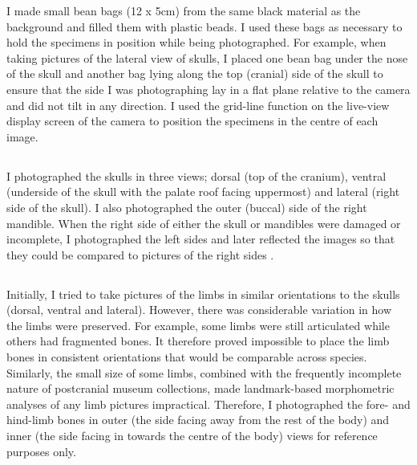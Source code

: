 I made small bean bags (12 x 5cm) from the same black material as the background and filled them with plastic beads. I used these bags as necessary to hold the specimens in position while being photographed. For example, when taking pictures of the lateral view of skulls, I placed one bean bag under the nose of the skull and another bag lying along the top (cranial) side of the skull to ensure that the side I was photographing lay in a flat plane relative to the camera and did not tilt in any direction. 
I used the grid-line function on the live-view display screen of the camera to position the specimens in the centre of each image. 

\subsection{}
I photographed the skulls in three views; dorsal (top of the cranium), ventral (underside of the skull with the palate roof facing uppermost) and lateral (right side of the skull). I also photographed the outer (buccal) side of the right mandible. When the right side of either the skull or mandibles were damaged or incomplete, I photographed the left sides and later reflected the images so that they could be compared to pictures of the right sides \citep[e.g.][]{Barrow2008}.


\subsection{}
Initially, I tried to take pictures of the limbs in similar orientations to the skulls (dorsal, ventral and lateral). However, there was considerable variation in how the limbs were preserved. For example, some limbs were still articulated while others had fragmented bones. It therefore proved impossible to place the limb bones in consistent orientations that would be comparable across species. Similarly, the small size of some limbs, combined with the frequently incomplete nature of postcranial museum collections, made landmark-based morphometric analyses of any limb pictures impractical. Therefore, I photographed the fore- and hind-limb bones in outer (the side facing away from the rest of the body) and inner (the side facing in towards the centre of the body) views for reference purposes only.

